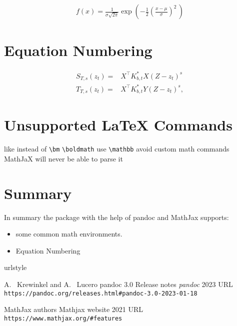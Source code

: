 \begin{align}
f(x) = \frac{1}{\sigma\sqrt{2\pi}} 
  \exp\left( -\frac{1}{2}\left(\frac{x-\mu}{\sigma}\right)^{\!2}\,\right)
  \label{eq:2}
\end{align}

\section{Equation Numbering}
\begin{align}
S_{T, s}(z_t) = & X^{\top} K_{b,t}^* X (Z - z_t)^s \nonumber\\
T_{T, s}(z_t) = &X^{\top} K_{b,t}^* Y (Z - z_t)^s,
\label{eq:tvpols}
\end{align}

\section{Unsupported LaTeX Commands}

like instead of \verb|\bm| \verb|\boldmath| use \verb|\mathbb|
avoid custom math commands MathJaX will never be able to parse it


\section{Summary}

In summary the  package with the help of pandoc and MathJax supports:
\begin{itemize}
\item some common math environments.
\item Equation Numbering
\end{itemize}


\begin{thebibliography}{2}
    \providecommand{\natexlab}[1]{#1}
    \providecommand{\url}[1]{\texttt{#1}}
    \expandafter\ifx\csname urlstyle\endcsname\relax
      \providecommand{\doi}[1]{doi: #1}\else
      \providecommand{\doi}{doi: \begingroup \urlstyle{rm}\Url}\fi

A.~ Krewinkel and A.~ Lucero
\newblock pandoc 3.0 Release notes
\newblock \emph{pandoc}  2023
\newblock URL \url{https://pandoc.org/releases.html#pandoc-3.0-2023-01-18}

MathJax authors
\newblock Mathjax website
\newblock  {} 2021
\newblock URL \url{https://www.mathjax.org/#features}

\end{thebibliography}


\address{%
Abhishek Ulayil\\
Student, Institute of Actuaries of India\\%
Mumbai, India\\
ORCiD: 0009-0000-6935-8690\\
}
